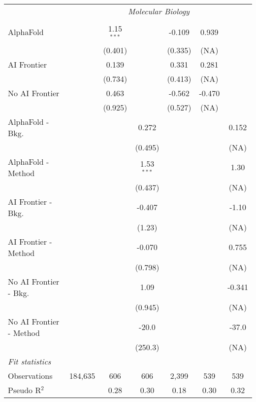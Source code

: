 \begin{tabular}{lcccccc}
 & \multicolumn{6}{c}{\textit{Molecular Biology}} \\ \\
   AlphaFold               &         & 1.15$^{***}$ &              & -0.109    & 0.939     &   \\   
                           &         & (0.401)      &              & (0.335)   & (NA)      &   \\   
   AI Frontier             &         & 0.139        &              & 0.331     & 0.281     &   \\   
                           &         & (0.734)      &              & (0.413)   & (NA)      &   \\   
   No AI Frontier          &         & 0.463        &              & -0.562    & -0.470    &   \\   
                           &         & (0.925)      &              & (0.527)   & (NA)      &   \\   
   AlphaFold - Bkg.        &         &              & 0.272        &           &           & 0.152\\   
                           &         &              & (0.495)      &           &           & (NA)\\   
   AlphaFold - Method      &         &              & 1.53$^{***}$ &           &           & 1.30\\   
                           &         &              & (0.437)      &           &           & (NA)\\   
   AI Frontier - Bkg.      &         &              & -0.407       &           &           & -1.10\\   
                           &         &              & (1.23)       &           &           & (NA)\\   
   AI Frontier - Method    &         &              & -0.070       &           &           & 0.755\\   
                           &         &              & (0.798)      &           &           & (NA)\\   
   No AI Frontier - Bkg.   &         &              & 1.09         &           &           & -0.341\\   
                           &         &              & (0.945)      &           &           & (NA)\\   
   No AI Frontier - Method &         &              & -20.0        &           &           & -37.0\\   
                           &         &              & (250.3)      &           &           & (NA)\\   
   \midrule
   \emph{Fit statistics}\\
   Observations            & 184,635 & 606          & 606          & 2,399     & 539       & 539\\  
   Pseudo R$^2$            &         & 0.28         & 0.30         & 0.18      & 0.30      & 0.32\\  
   

\end{tabular}
